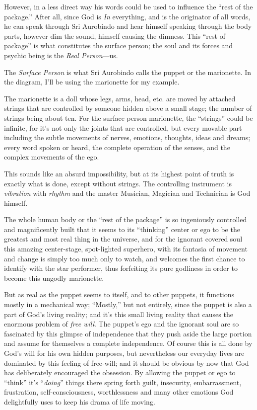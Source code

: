 \documentclass[12pt,a4paper]{book}
\begin{document}
However, in a less direct way his words could be used to influence the
``rest of the package.''  After all, since God is \emph{In}
everything, and is the originator of all words, he can speak through
Sri Aurobindo and hear himself speaking through the body parts,
however dim the sound, himself causing the dimness. This ``rest of
package'' is what constitutes the surface person; the soul and its
forces and psychic being is the \emph{Real Person}---us.

The \emph{Surface Person} is what Sri Aurobindo calls the puppet or
the marionette. In the diagram, I'll be using the marionette for my
example.

The marionette is a doll whose legs, arms, head, etc. are moved by
attached strings that are controlled by someone hidden above a small
stage; the number of strings being about ten. For the surface person
marionette, the ``strings'' could be infinite, for it's not only the
joints that are controlled, but every movable part including the
subtle movements of nerves, emotions, thoughts, ideas and dreams;
every word spoken or heard, the complete operation of the senses, and
the complex movements of the ego.

This sounds like an absurd impossibility, but at its highest point of
truth is exactly what is done, except without strings. The controlling
instrument is \emph{vibration} with \emph{rhythm} and the master
Musician, Magician and Technician is God himself.

The whole human body or the ``rest of the package'' is so ingeniously
controlled and magnificently built that it seems to its ``thinking''
center or ego to be the greatest and most real thing in the universe,
and for the ignorant covered soul this amazing center-stage,
spot-lighted superhero, with its fantasia of movement and change is
simply too much only to watch, and welcomes the first chance to
identify with the star performer, thus forfeiting its pure godliness
in order to become this ungodly marionette.

But as real as the puppet seems to itself, and to other puppets, it
functions mostly in a mechanical way; ``Mostly,'' but not entirely,
since the puppet is also a part of God's living reality; and it's this
small living reality that causes the enormous problem of \emph{free
  will}.  The puppet's ego and the ignorant soul are so fascinated by
this glimpse of independence that they push aside the large portion
and assume for themselves a complete independence.  Of course this is
all done by God's will for his own hidden purposes, but nevertheless
our everyday lives are dominated by this feeling of free-will; and it
should be obvious by now that God has deliberately encouraged the
obsession. By allowing the puppet or ego to ``think'' it's
``\emph{doing}'' things there spring forth guilt, insecurity,
embarrassment, frustration, self-consciousness, worthlessness and many
other emotions God delightfully uses to keep his drama of life moving.
\end{document}
